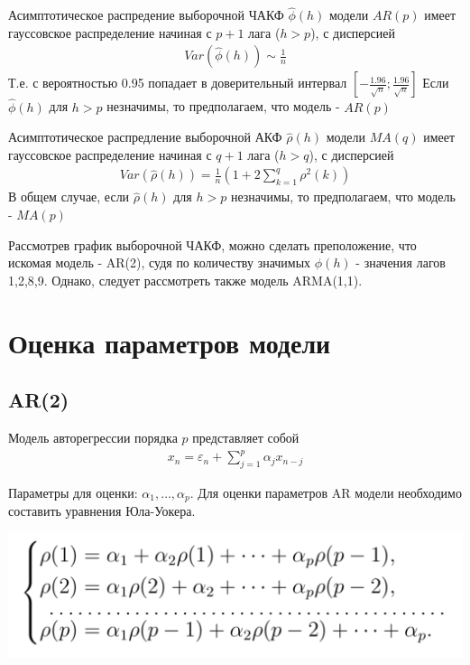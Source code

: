 \documentclass{article}
\begin{document}
Асимптотическое распредение выборочной ЧАКФ $\hat{\phi}(h)$ модели $AR(p)$ имеет гауссовское распределение начиная с $p+1$ лага ($h>p$), с дисперсией 
\begin{gather*}
    Var(\hat{\phi}(h))\sim\frac{1}{n}
\end{gather*}
Т.е. с вероятностью 0.95 попадает в доверительный интервал $[-\frac{1.96}{\sqrt{n}}; \frac{1.96}{\sqrt{n}}]$\newline
Если $\hat{\phi}(h)$ для $h>p$ незначимы, то предполагаем, что модель - $AR(p)$\newline\newline

Асимптотическое распредление выборочной АКФ $\hat{\rho}(h)$ модели $MA(q)$ имеет гауссовское распределение начиная с $q+1$ лага ($h>q$), с дисперсией 
\begin{gather*}
    Var(\hat{\rho}(h))=\frac{1}{n}(1+2\sum_{k=1}^{q}\rho^2(k))
\end{gather*}
В общем случае, если $\hat{\rho}(h)$ для $h>p$ незначимы, то предполагаем, что модель - $MA(p)$\newline\newline

Рассмотрев график выборочной ЧАКФ, можно сделать преположение, что искомая модель - AR(2), судя по количеству значимых $\phi(h)$  - значения лагов 1,2,8,9. Однако, следует рассмотреть также модель ARMA(1,1).\newpage

\section{Оценка параметров модели}
\subsection{AR(2)}

Модель авторегрессии порядка $p$ представляет собой
\begin{gather*}
    x_n = \varepsilon_n + \sum_{j=1}^{p}\alpha_jx_{n-j}
\end{gather*}

Параметры для оценки: $\alpha_1,\ldots,\alpha_p$. Для оценки параметров AR модели необходимо составить уравнения Юла-Уокера.

\includegraphics[width=\linewidth]{scre.png}
\end{document}
